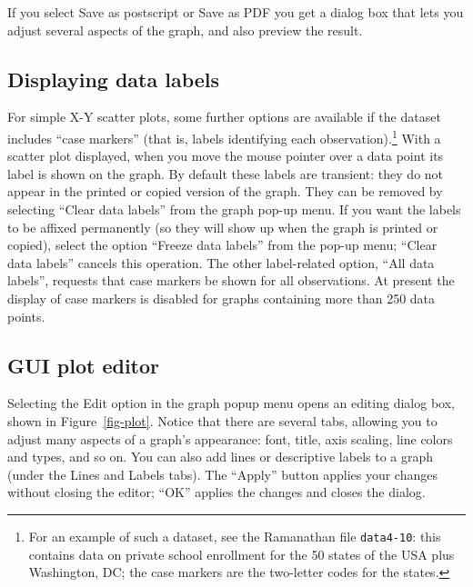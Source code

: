 If you select \textsf{Save as postscript} or \textsf{Save as PDF} you
get a dialog box that lets you adjust several aspects of the graph,
and also preview the result.

\subsection{Displaying data labels}
\label{plot-labels}

For simple X-Y scatter plots, some further options are available if
the dataset includes ``case markers'' (that is, labels identifying
each observation).\footnote{For an example of such a dataset, see the
  Ramanathan file \verb+data4-10+: this contains data on private
  school enrollment for the 50 states of the USA plus Washington, DC;
  the case markers are the two-letter codes for the states.} With a
scatter plot displayed, when you move the mouse pointer over a data
point its label is shown on the graph.  By default these labels are
transient: they do not appear in the printed or copied version of the
graph.  They can be removed by selecting ``Clear data labels'' from
the graph pop-up menu. If you want the labels to be affixed
permanently (so they will show up when the graph is printed or
copied), select the option ``Freeze data labels'' from the pop-up
menu; ``Clear data labels'' cancels this operation.  The other
label-related option, ``All data labels'', requests that case markers
be shown for all observations.  At present the display of case markers
is disabled for graphs containing more than 250 data points.


\subsection{GUI plot editor}
\label{plot-editor}

Selecting the \textsf{Edit} option in the graph popup menu opens an
editing dialog box, shown in Figure~\ref{fig-plot}.  Notice that there
are several tabs, allowing you to adjust many aspects of a graph's
appearance: font, title, axis scaling, line colors and types, and so
on.  You can also add lines or descriptive labels to a graph (under
the Lines and Labels tabs).  The ``Apply'' button applies your changes
without closing the editor; ``OK'' applies the changes and closes the
dialog.

